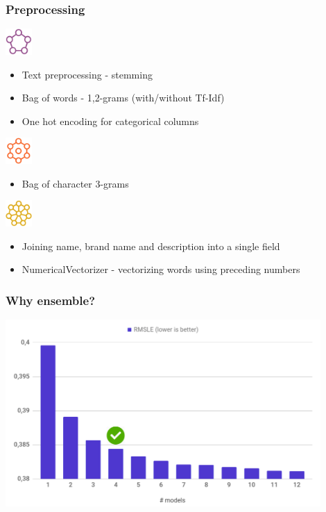 \begin{frame}
\frametitle{Preprocessing}


\includegraphics[width=1cm]{img/level_expert.png}
\begin{itemize}
\item Text preprocessing - stemming
\item Bag of words - 1,2-grams (with/without Tf-Idf)
\item One hot encoding for categorical columns
\end{itemize}

\includegraphics[width=1cm]{img/level_master.png}
\begin{itemize}
\item Bag of character 3-grams
\end{itemize}

\includegraphics[width=1cm]{img/level_grandmaster.png}
\begin{itemize}
\item Joining name, brand name and description into a single field
\item NumericalVectorizer - vectorizing words using preceding numbers
\end{itemize}

\end{frame}

\begin{frame}
\frametitle{Why ensemble?}

\includegraphics[width=12cm]{img/models_combination.png}

\end{frame}


